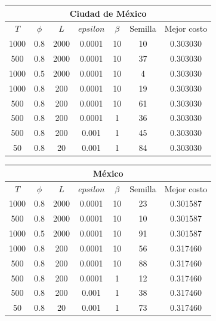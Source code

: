 \documentclass{article}
\begin{document}
  \begin{center}
    \begin{tabular}{|c|c|c|c|c|c|c|}
      \hline
      \multicolumn{7}{|c|}{Ciudad de México}                             \\
      \hline
      $T$  & $\phi$ & $L$  & $epsilon$ & $\beta$ & Semilla & Mejor costo \\
      1000 & 0.8    & 2000 & 0.0001    & 10      &  10     & 0.303030    \\
      500  & 0.8    & 2000 & 0.0001    & 10      &  37     & 0.303030    \\
      1000 & 0.5    & 2000 & 0.0001    & 10      &  4      & 0.303030    \\
      1000 & 0.8    & 200  & 0.0001    & 10      &  19     & 0.303030    \\
      500  & 0.8    & 200  & 0.0001    & 10      &  61     & 0.303030    \\
      500  & 0.8    & 200  & 0.0001    & 1       &  36     & 0.303030    \\
      500  & 0.8    & 200  & 0.001     & 1       &  45     & 0.303030    \\
      50   & 0.8    & 20   & 0.001     & 1       &  84     & 0.303030    \\
      \hline
    \end{tabular}
  \end{center}

  \begin{center}
    \begin{tabular}{|c|c|c|c|c|c|c|}
      \hline
      \multicolumn{7}{|c|}{México}                                       \\
      \hline
      $T$  & $\phi$ & $L$  & $epsilon$ & $\beta$ & Semilla & Mejor costo \\
      1000 & 0.8    & 2000 & 0.0001    & 10      & 23      & 0.301587    \\
      500  & 0.8    & 2000 & 0.0001    & 10      & 10      & 0.301587    \\
      1000 & 0.5    & 2000 & 0.0001    & 10      & 91      & 0.301587    \\
      1000 & 0.8    & 200  & 0.0001    & 10      & 56      & 0.317460    \\
      500  & 0.8    & 200  & 0.0001    & 10      & 88      & 0.317460    \\
      500  & 0.8    & 200  & 0.0001    & 1       & 12      & 0.317460    \\
      500  & 0.8    & 200  & 0.001     & 1       & 38      & 0.317460    \\
      50   & 0.8    & 20   & 0.001     & 1       & 73      & 0.317460    \\
      \hline
    \end{tabular}
  \end{center}
\end{document}
